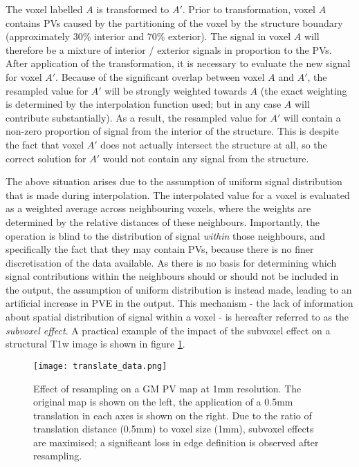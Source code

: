 The voxel labelled $A$ is transformed to $A'$. Prior to transformation, voxel $A$ contains PVs caused by the partitioning of the voxel by the structure boundary (approximately 30\% interior and 70\% exterior). The signal in voxel $A$ will therefore be a mixture of interior / exterior signals in proportion to the PVs. After application of the transformation, it is necessary to evaluate the new signal for voxel $A'$. Because of the significant overlap between voxel $A$ and $A'$, the resampled value for $A'$ will be strongly weighted towards $A$ (the exact weighting is determined by the interpolation function used; but in any case $A$ will contribute substantially). As a result, the resampled value for $A'$ will contain a non-zero proportion of signal from the interior of the structure. This is despite the fact that voxel $A'$ does not actually intersect the structure at all, so the correct solution for $A'$ would not contain any signal from the structure. 

The above situation arises due to the assumption of uniform signal distribution that is made during interpolation. The interpolated value for a voxel is evaluated as a weighted average across neighbouring voxels, where the weights are determined by the relative distances of these neighbours. Importantly, the operation is blind to the distribution of signal \textit{within} those neighbours, and specifically the fact that they may contain PVs, because there is no finer discretisation of the data available. As there is no basis for determining which signal contributions within the neighbours should or should not be included in the output, the assumption of uniform distribution is instead made, leading to an artificial increase in PVE in the output. This mechanism - the lack of information about spatial distribution of signal within a voxel - is hereafter referred to as the \textit{subvoxel effect}. A practical example of the impact of the subvoxel effect on a structural T1w image is shown in figure \ref{translate_data}. 

\begin{figure}
\centering
\texttt{[image: translate\_data.png]}
\caption{Effect of resampling on a GM PV map at 1mm resolution. The original map is shown on the left, the application of a 0.5mm translation in each axes is shown on the right. Due to the ratio of translation distance (0.5mm) to voxel size (1mm), subvoxel effects are maximised; a significant loss in edge definition is observed after resampling.}
\label{translate_data}
\end{figure}

